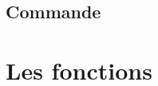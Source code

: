 \documentclass[letterpaper,10pt,french]{sphinxmanual}
\begin{document}
\subsection{Commande}
\label{\detokenize{exemples/valeurs:commande}}
\begin{sphinxVerbatim}[commandchars=\\\{\}]
  \PYGZbs{}
	 \PYGZbs{}
	  \PYGZbs{}
	  \PYGZbs{}
	 
\end{sphinxVerbatim}

\sphinxstepscope


\section{Les fonctions}
\label{\detokenize{exemples/fonctions:les-fonctions}}\label{\detokenize{exemples/fonctions:exemples-fonctions}}\label{\detokenize{exemples/fonctions::doc}}
\end{document}
